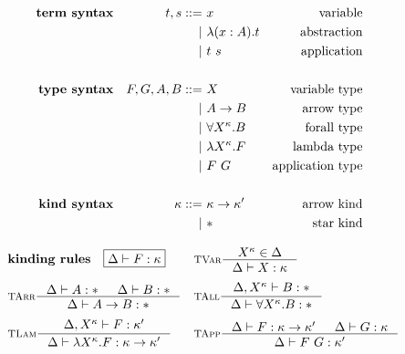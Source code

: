 \begin{figure}
\begin{singlespace}
\def\baselinestretch{0}
\small
\begin{align*}
\textbf{term syntax}
&& t,s ::= &~ x               & \text{variable}    \\
&&       | &~ \lambda(x:A) . t     & \text{abstraction} \\
&&       | &~ t ~ s           & \text{application} \\ \\
\textbf{type syntax}
&& F,G,A,B ::= &~ X                  & \text{variable type} \\
&&           | &~ A -> B             & \text{arrow type} \\
&&           | &~ \forall X^\kappa.B & \text{forall type}   \\
&&           | &~ \lambda X^\kappa.F      & \text{lambda type}   \\
&&           | &~ F ~ G              & \text{application type}   \\ \\
\textbf{kind syntax}
&& \kappa ::= &~ \kappa -> \kappa' & \text{arrow kind} \\
&&          | &~ *                 & \text{star kind}
\end{align*}

\begin{align*}
& \textbf{kinding rules} \quad \framebox{$ \Delta |- F:\kappa $}
&&\inference[\sc TVar]{X^\kappa \in \Delta}{\Delta |- X:\kappa}
	\phantom{\frac{A}{\frac{A}{A^A}}} \\
& \inference[\sc TArr]{\Delta |- A:* & \Delta |- B:*}{\Delta |- A -> B:*}
&&\inference[\sc TAll]{\Delta,X^\kappa |- B:*}
                      {\Delta |- \forall X^\kappa.B:*}
	\phantom{\frac{A}{\frac{A}{A^A}}} \\
& \inference[\sc TLam]{\Delta,X^\kappa |- F:\kappa'}
                      {\Delta |- \l X^\kappa.F:\kappa -> \kappa'}
&&\inference[\sc TApp]{\Delta |- F : \kappa -> \kappa' & \Delta |- G : \kappa}
                      {\Delta |- F ~ G : \kappa'}
\end{align*}


\end{singlespace}
\end{figure}
